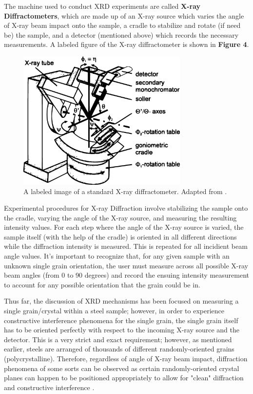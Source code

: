 \documentclass[10pt]{article}
\begin{document}
The machine used to conduct XRD experiments are called \textbf{X-ray Diffractometers}, which are made up of an X-ray source which varies the angle of X-ray beam impact onto the sample, a cradle to
stabilize and rotate (if need be) the sample, and a detector (mentioned above) which records the necessary measurements. A labeled figure of the X-ray diffractometer is shown in \textbf{Figure 4}.
\begin{figure}[h]
    \centering
    \includegraphics[width=8.5cm]{fig4}
    \caption{\label{tab1}A labeled image of a standard X-ray diffractometer. Adapted from \cite{ref04}.} 
    \end{figure} 
Experimental procedures for X-ray Diffraction involve stabilizing the sample onto the cradle, varying the angle of the X-ray source, and measuring the resulting intensity
values. For each step where the angle of the X-ray source is varied, the sample itself (with the help of the cradle) is oriented in all different directions while the diffraction intensity is measured. This is repeated for all incidient beam angle values.
It's important to recognize that, for any given sample with an unknown single grain orientation, the user must measure across all possible X-ray beam angles (from 0 to 90 degrees) and record the ensuing intensity 
measurement to account for any possible orientation that the grain could be in.

Thus far, the discussion of XRD mechanisms has been focused on measuring a single grain/crystal within a steel sample; however, in order to experience
constructive interference phenomena for the single grain, the single grain itself has to be oriented perfectly with respect to the incoming X-ray source and the
detector. This is a very strict and exact requirement; however, as mentioned earlier,
steels are arranged of thousands of different randomly-oriented grains (polycrystalline). Therefore, regardless of angle of X-ray beam impact, diffraction
phenomena of some sorts can be observed as certain randomly-oriented crystal planes can happen to be positioned appropriately to allow for "clean" diffraction and constructive
interference \cite{ref05}.
\end{document}
